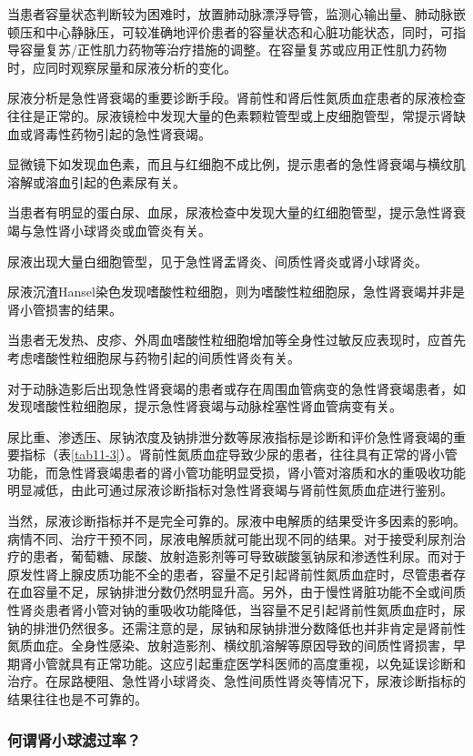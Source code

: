 当患者容量状态判断较为困难时，放置肺动脉漂浮导管，监测心输出量、肺动脉嵌顿压和中心静脉压，可较准确地评价患者的容量状态和心脏功能状态，同时，可指导容量复苏/正性肌力药物等治疗措施的调整。在容量复苏或应用正性肌力药物时，应同时观察尿量和尿液分析的变化。

尿液分析是急性肾衰竭的重要诊断手段。肾前性和肾后性氮质血症患者的尿液检查往往是正常的。尿液镜检中发现大量的色素颗粒管型或上皮细胞管型，常提示肾缺血或肾毒性药物引起的急性肾衰竭。

显微镜下如发现血色素，而且与红细胞不成比例，提示患者的急性肾衰竭与横纹肌溶解或溶血引起的色素尿有关。

当患者有明显的蛋白尿、血尿，尿液检查中发现大量的红细胞管型，提示急性肾衰竭与急性肾小球肾炎或血管炎有关。

尿液出现大量白细胞管型，见于急性肾盂肾炎、间质性肾炎或肾小球肾炎。

尿液沉渣Hansel染色发现嗜酸性粒细胞，则为嗜酸性粒细胞尿，急性肾衰竭并非是肾小管损害的结果。

当患者无发热、皮疹、外周血嗜酸性粒细胞增加等全身性过敏反应表现时，应首先考虑嗜酸性粒细胞尿与药物引起的间质性肾炎有关。

对于动脉造影后出现急性肾衰竭的患者或存在周围血管病变的急性肾衰竭患者，如发现嗜酸性粒细胞尿，提示急性肾衰竭与动脉栓塞性肾血管病变有关。

尿比重、渗透压、尿钠浓度及钠排泄分数等尿液指标是诊断和评价急性肾衰竭的重要指标（表\ref{tab11-3}）。肾前性氮质血症导致少尿的患者，往往具有正常的肾小管功能，而急性肾衰竭患者的肾小管功能明显受损，肾小管对溶质和水的重吸收功能明显减低，由此可通过尿液诊断指标对急性肾衰竭与肾前性氮质血症进行鉴别。

当然，尿液诊断指标并不是完全可靠的。尿液中电解质的结果受许多因素的影响。病情不同、治疗干预不同，尿液电解质就可能出现不同的结果。对于接受利尿剂治疗的患者，葡萄糖、尿酸、放射造影剂等可导致碳酸氢钠尿和渗透性利尿。而对于原发性肾上腺皮质功能不全的患者，容量不足引起肾前性氮质血症时，尽管患者存在血容量不足，尿钠排泄分数仍然明显升高。另外，由于慢性肾脏功能不全或间质性肾炎患者肾小管对钠的重吸收功能降低，当容量不足引起肾前性氮质血症时，尿钠的排泄仍然很多。还需注意的是，尿钠和尿钠排泄分数降低也并非肯定是肾前性氮质血症。全身性感染、放射造影剂、横纹肌溶解等原因导致的间质性肾损害，早期肾小管就具有正常功能。这应引起重症医学科医师的高度重视，以免延误诊断和治疗。在尿路梗阻、急性肾小球肾炎、急性间质性肾炎等情况下，尿液诊断指标的结果往往也是不可靠的。

\subsubsection{何谓肾小球滤过率？}

